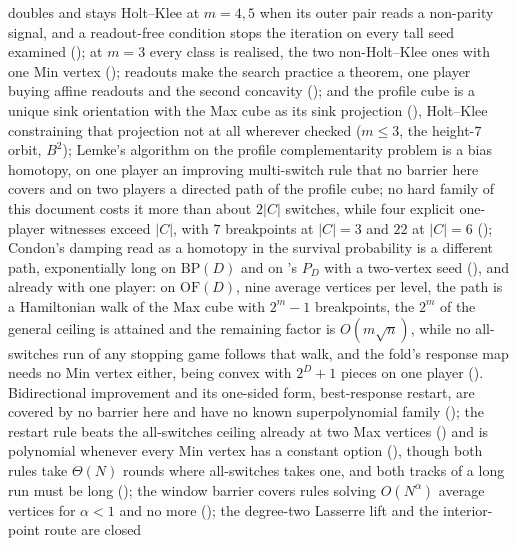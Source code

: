 \documentclass[11pt]{article}
\theoremstyle{plain}
\theoremstyle{definition}
\begin{document}
doubles and stays Holt--Klee at $m=4,5$ when its outer pair reads a
non-parity signal, and a readout-free condition stops the iteration on
every tall seed examined ();
at $m=3$ every class is realised, the two non-Holt--Klee ones with one
Min vertex (); readouts make the search practice a theorem,
one player buying affine readouts and the second concavity
(); and the profile cube is a
unique sink orientation with the Max cube as its sink projection
(), Holt--Klee constraining that
projection not at all wherever checked ($m\le3$, the height-$7$ orbit,
$B^{2}$); Lemke's algorithm on the profile complementarity problem is a
bias homotopy, on one player an improving multi-switch rule that no
barrier here covers and on two players a directed path of the profile
cube; no hard family of this document costs it more than about $2|C|$
switches, while four explicit one-player witnesses exceed $|C|$, with
$7$ breakpoints at $|C|=3$ and $22$ at $|C|=6$
(); Condon's damping read as a homotopy
in the survival probability is a different path, exponentially long on
$\mathrm{BP}(D)$ and on 's $P_D$ with a two-vertex seed
(), and already with one
player: on $\mathrm{OF}(D)$, nine average vertices per level, the path
is a Hamiltonian walk of the Max cube with $2^{m}-1$ breakpoints, the
$2^{m}$ of the general ceiling is attained and the remaining factor is
$O(m\sqrt n)$, while no all-switches run of any stopping game follows
that walk, and the fold's response map needs no Min vertex either, being
convex with $2^{D}+1$ pieces on one player
(). Bidirectional improvement and its
one-sided form, best-response restart, are covered by no barrier here and
have no known superpolynomial family
(); the restart rule beats the
all-switches ceiling already at two Max vertices () and is
polynomial whenever every Min vertex has a constant option
(), though both rules take
$\Theta(N)$ rounds where all-switches takes one, and both tracks of a
long run must be long (); the
window barrier covers rules solving $O(N^{\alpha})$ average vertices for
$\alpha<1$ and no more (); the degree-two
Lasserre lift and the interior-point route are closed
\end{document}
